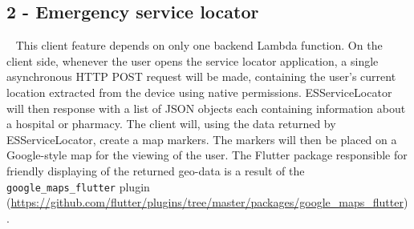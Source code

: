 \documentclass[10pt, a4paper]{article}
\begin{document}
\subsection{2 - Emergency service locator}
\par ~ This client feature depends on only one backend Lambda function. On the client side, whenever the user opens the service locator application, a single asynchronous HTTP POST request will be made, containing the user's current location extracted from the device using native permissions. ESServiceLocator will then response with a list of JSON objects each containing information about a hospital or pharmacy. The client will, using the data returned by ESServiceLocator, create a map markers. The markers will then be placed on a Google-style map for the viewing of the user. The Flutter package responsible for friendly displaying of the returned geo-data is a result of the \texttt{google\_maps\_flutter} plugin (\url{https://github.com/flutter/plugins/tree/master/packages/google\_maps\_flutter}).
\end{document}
